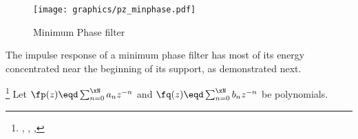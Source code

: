 \begin{figure}[ht]
  \centering%
  \texttt{[image: graphics/pz\_minphase.pdf]}%
\caption{
   Minimum Phase filter
   \label{fig:pz_minphase}
   }
\end{figure}


The impulse response of a minimum phase filter has most of its energy concentrated
near the beginning of its support, as demonstrated next.
\begin{theorem}
\footnote{
  ,
  ,  %
  ,  %
  }
\label{thm:ztr_redp}
Let $\fp(z)\eqd\sum_{n=0}^\xN a_n z^{-n}$ 
and $\fq(z)\eqd\sum_{n=0}^\xN b_n z^{-n}$ 
be polynomials.
\end{theorem}


